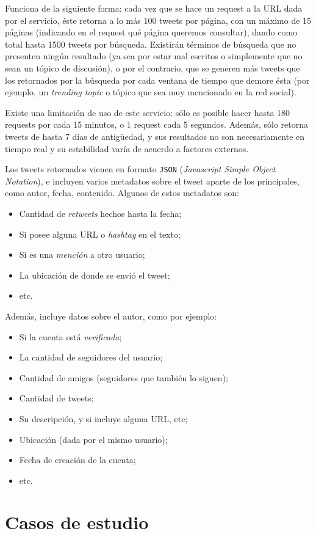   Funciona de la siguiente forma: cada vez que se hace un request a la
   URL dada por el servicio, éste retorna a lo más 100 tweets por página, con un
   máximo de 15 páginas (indicando en el request qué página queremos
   consultar), dando como total hasta 1500 tweets por búsqueda. Existirán
   términos de búsqueda que no presenten ningún resultado  (ya sea por
   estar mal escritos o simplemente que no sean un tópico de discusión), o por
   el contrario, que se generen más tweets que los retornados por la
   búsqueda por cada ventana de tiempo que demore ésta (por ejemplo, un
   \emph{trending topic} o tópico que sea muy mencionado en la red social).

   Existe una limitación de uso de este servicio: sólo es posible hacer
   hasta 180 requests por cada 15 minutos, o 1 request cada 5
   segundos. Además, sólo retorna tweets de hasta 7 días de antigüedad, y
   sus resultados no son necesariamente en tiempo real y su estabilidad
   varía de acuerdo a factores externos.

   Los tweets retornados vienen en formato \texttt{JSON} (\emph{Javascript Simple Object Notation}),
   e incluyen varios metadatos sobre el tweet aparte de los principales,
   como autor, fecha, contenido. Algunos de estos metadatos son:

\begin{itemize}
\item Cantidad de \emph{retweets} hechos hasta la fecha;
\item Si posee alguna URL o \emph{hashtag} en el texto;
\item Si es una \emph{mención} a otro usuario;
\item La ubicación de donde se envió el tweet;
\item etc.
\end{itemize}
  Además, incluye datos sobre el autor, como por ejemplo:

\begin{itemize}
\item Si la cuenta está \emph{verificada};
\item La cantidad de seguidores del usuario;
\item Cantidad de amigos (seguidores que también lo siguen);
\item Cantidad de tweets;
\item Su descripción, y si incluye alguna URL, etc;
\item Ubicación (dada por el mismo usuario);
\item Fecha de creación de la cuenta;
\item etc.
\end{itemize}
\section{Casos de estudio}
\label{sec-4.4}

\label{casosest}